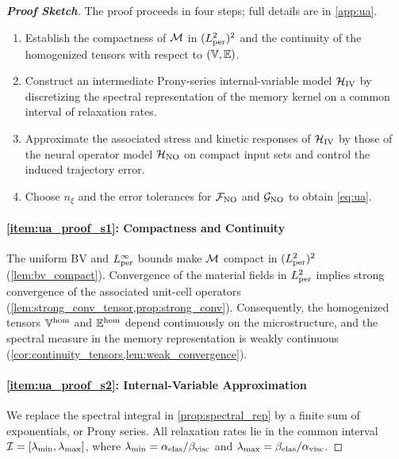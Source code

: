 \documentclass[3p, 12pt, preprint]{elsarticle}
\begin{document}
\begin{proof}[\bf Proof Sketch]
The proof proceeds in four steps; full details are in \cref{app:ua}.

\begin{enumerate}[label=(S\arabic*), ref=(S\arabic*)]
    \item\label{item:ua_proof_s1} Establish the compactness of ${\mathcal{M}}$ in $(L^2_{\rm per})^2$ and the continuity of the homogenized tensors with respect to $(\mathbb{V},\mathbb{E})$.
    \item\label{item:ua_proof_s2} Construct an intermediate Prony-series internal-variable model ${\mathcal{H}}_{\mathrm{IV}}$ by discretizing the spectral representation of the memory kernel on a common interval of relaxation rates.
    \item\label{item:ua_proof_s3} Approximate the associated stress and kinetic responses of ${\mathcal{H}}_{\mathrm{IV}}$ by those of the neural operator model ${\mathcal{H}}_{\mathrm{NO}}$ on compact input sets and control the induced trajectory error.
    \item\label{item:ua_proof_s4} Choose $n_{\xi}$ and the error tolerances for ${\mathcal{F}}_{\mathrm{NO}}$ and ${\mathcal{G}}_{\mathrm{NO}}$ to obtain \cref{eq:ua}.
\end{enumerate}

\paragraph{\ref{item:ua_proof_s1}: Compactness and Continuity}
The uniform BV and $L^\infty_{\rm per}$ bounds make ${\mathcal{M}}$ compact in $(L^2_{\rm per})^2$ (\cref{lem:bv_compact}). Convergence of the material fields in $L^2_{\rm per}$ implies strong convergence of the associated unit-cell operators (\cref{lem:strong_conv_tensor,prop:strong_conv}). Consequently, the homogenized tensors $\mathbb{V}^{\rm hom}$ and $\mathbb{E}^{\rm hom}$ depend continuously on the microstructure, and the spectral measure in the memory representation is weakly continuous (\cref{cor:continuity_tensors,lem:weak_convergence}).

{\color{blue}
\paragraph{\ref{item:ua_proof_s2}: Internal-Variable Approximation}
We replace the spectral integral in \cref{prop:spectral_rep} by a finite sum of exponentials, or Prony series. All relaxation rates lie in the common interval ${\mathcal{I}}=[\lambda_{\min},\lambda_{\max}]$, where $\lambda_{\min}=\alpha_{\rm elas}/\beta_{\rm visc}$ and $\lambda_{\max}=\beta_{\rm elas}/\alpha_{\rm visc}$.

}
\end{proof}
\end{document}
